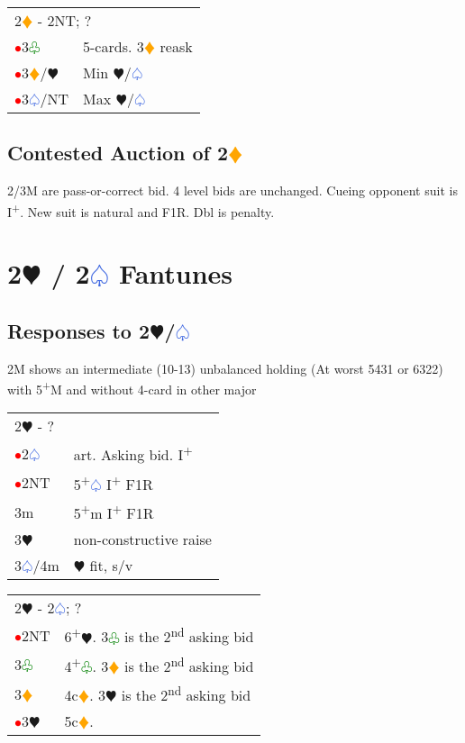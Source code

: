 \documentclass{article}
\renewcommand{\sp}{\textcolor{RoyalBlue}{$\varspade$}}
\newcommand{\he}{\textcolor{RubineRed}{$\varheart$}}
\newcommand{\di}{\textcolor{Orange}{$\vardiamond$}}
\newcommand{\cl}{\textcolor{Green}{$\varclub$}}
\newcommand{\nt}{\relsize{-1}NT\relsize{1}}
\newcommand{\up}{\textsuperscript{+}}
\newcommand{\al}{\textcolor{red}{$\bullet$}}
\begin{document}
\medskip

\begin{tabular}{|l|p{6.5cm}}
	\multicolumn{2}{l}{2\di{} - 2\nt{}; ?}\\
	\al{}3\cl{} & 5-cards. 3\di{} reask \\
	\al{}3\di{}/\he{} & Min \he{}/\sp{} \\
	\al{}3\sp{}/\nt{} & Max \he{}/\sp{} \\
\end{tabular}

\subsection{Contested Auction of 2\di{}}
2/3M are pass-or-correct bid. 4 level bids are unchanged. Cueing opponent suit is I\up{}. New suit is natural and F1R. Dbl is penalty.

\section{2\he{} / 2\sp{} Fantunes}

\subsection{Responses to 2\he{}/\sp{}}

2M shows an intermediate (10-13) unbalanced holding (At worst 5431 or 6322) with 5\up{}M and without 4-card in other major \\

\begin{tabular}{|l|p{6.5cm}}
	\multicolumn{2}{l}{2\he{} -  ?} \\
	\al{}2\sp & art. Asking bid. I\up \\
	\al{}2\nt & 5\up\sp{} I\up{} F1R \\
    3m & 5\up{}m I\up{} F1R \\
    3\he & non-constructive raise \\
    3\sp{}/4m & \he{} fit, s/v 
\end{tabular}

\medskip

\begin{tabular}{|l|p{6.5cm}}
	\multicolumn{2}{l}{2\he{} - 2\sp{}; ?}\\
	\al{}2\nt & 6\up\he{}. 3\cl{} is the 2\textsuperscript{nd} asking bid \\
	3\cl & 4\up\cl{}. 3\di{} is the 2\textsuperscript{nd} asking bid \\
	3\di & 4c\di{}. 3\he{} is the 2\textsuperscript{nd} asking bid \\
	\al{}3\he & 5c\di{}. 
\end{tabular}
\end{document}
